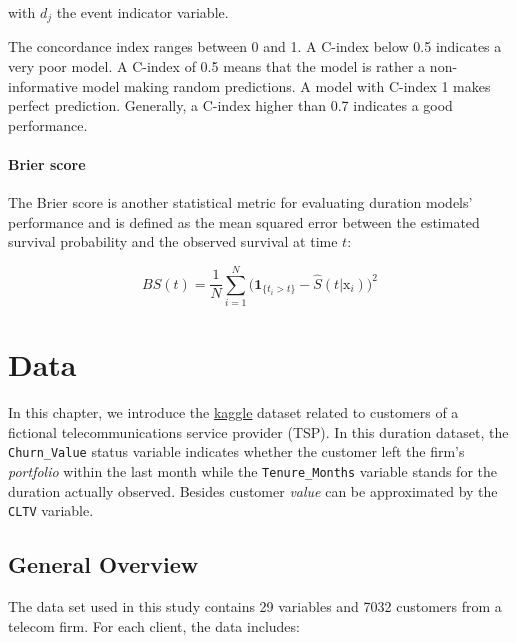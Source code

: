 \documentclass[
]{book}
\begin{document}
with \(d_j\) the event indicator variable.

The concordance index ranges between 0 and 1. A C-index below 0.5 indicates a very poor model. A C-index of 0.5 means that the model is rather a non-informative model making random predictions. A model with C-index 1 makes perfect prediction. Generally, a C-index higher than 0.7 indicates a good performance.

\hypertarget{brier-score}{%
\subsubsection*{Brier score}\label{brier-score}}

The Brier score is another statistical metric for evaluating duration models' performance and is defined as the mean squared error between the estimated survival probability and the observed survival at time \(t\):

\begin{equation}
  BS(t) = \frac{1}{N} \sum_{i=1}^{N} \Big(\pmb{1}_{\{t_i>t\}} - \hat{S}(t|\mathrm{x}_i) \Big)^2
  \label{eq:brier}
\end{equation}

\hypertarget{data}{%
\chapter{Data}\label{data}}

In this chapter, we introduce the \href{https://www.kaggle.com/yeanzc/telco-customer-churn-ibm-dataset}{kaggle} dataset related to customers of a fictional telecommunications service provider (TSP). In this duration dataset, the \texttt{Churn\_Value} status variable indicates whether the customer left the firm's \emph{portfolio} within the last month while the \texttt{Tenure\_Months} variable stands for the duration actually observed. Besides customer \emph{value} can be approximated by the \texttt{CLTV} variable.

\hypertarget{general-overview}{%
\section{General Overview}\label{general-overview}}

The data set used in this study contains 29 variables and 7032 customers from a telecom firm. For each client, the data includes:
\end{document}
